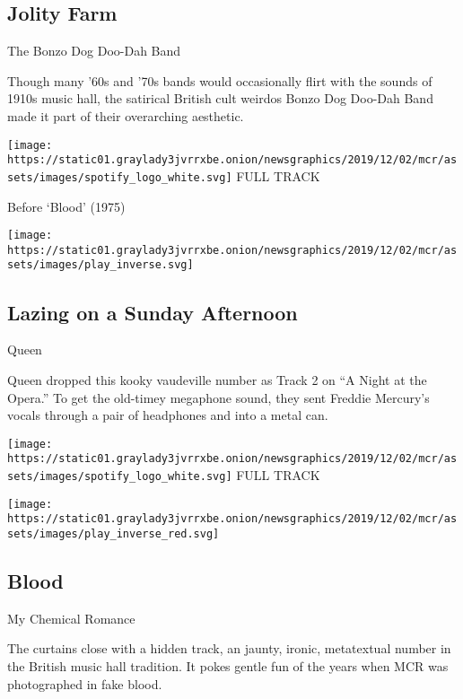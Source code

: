 \hypertarget{jolity-farm}{%
\subsection{Jolity Farm}\label{jolity-farm}}

The Bonzo Dog Doo-Dah Band

Though many '60s and '70s bands would occasionally flirt with the sounds
of 1910s music hall, the satirical British cult weirdos Bonzo Dog
Doo-Dah Band made it part of their overarching aesthetic.

\href{https://open.spotify.com/track/3HYSa1Wac6pokAeGoWFTDE?si=HUHsKcBnTL6ihbZ0VNe3rw}{}

\texttt{[image: https://static01.graylady3jvrrxbe.onion/newsgraphics/2019/12/02/mcr/assets/images/spotify\_logo\_white.svg]}
FULL TRACK

Before `Blood' (1975)

\texttt{[image: https://static01.graylady3jvrrxbe.onion/newsgraphics/2019/12/02/mcr/assets/images/play\_inverse.svg]}

\hypertarget{lazing-on-a-sunday-afternoon}{%
\subsection{Lazing on a Sunday
Afternoon}\label{lazing-on-a-sunday-afternoon}}

Queen

Queen dropped this kooky vaudeville number as Track 2 on ``A Night at
the Opera.'' To get the old-timey megaphone sound, they sent Freddie
Mercury's vocals through a pair of headphones and into a metal can.

\href{https://open.spotify.com/track/12TZzfqJyY3UvtZ3lq1WmY?si=CohMmBuES76CayjHJT0s-w}{}

\texttt{[image: https://static01.graylady3jvrrxbe.onion/newsgraphics/2019/12/02/mcr/assets/images/spotify\_logo\_white.svg]}
FULL TRACK

\texttt{[image: https://static01.graylady3jvrrxbe.onion/newsgraphics/2019/12/02/mcr/assets/images/play\_inverse\_red.svg]}

\hypertarget{blood-1}{%
\subsection{Blood}\label{blood-1}}

My Chemical Romance

The curtains close with a hidden track, an jaunty, ironic, metatextual
number in the British music hall tradition. It pokes gentle fun of the
years when MCR was photographed in fake blood.

